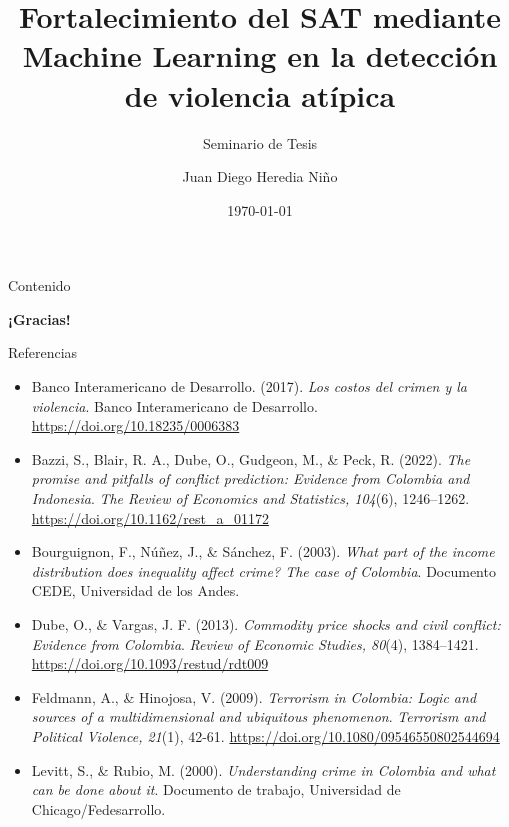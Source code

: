 \documentclass[aspectratio=169,xcolor=dvipsnames, t]{beamer}
\title[Pronóstico de Violencia Extrema]{Fortalecimiento del SAT mediante Machine Learning en la detección de violencia atípica}
\subtitle{Seminario de Tesis}
\author[Heredia Niño]{Juan Diego Heredia Niño}
\institute[Universidad de los Andes]{Facultad de Economía \newline Universidad de los Andes}
\date{\today}
\begin{document}
\maketitlepage

\begin{frame}[t]{Contenido}
    \tableofcontents
\end{frame}









\begin{frame}{}
    \vspace{3.5cm}
    \centering
    \LARGE \alert{\textbf{¡Gracias!}} 

\end{frame}

\begin{frame}{Referencias}

\begin{itemize}
\tiny
    \item Banco Interamericano de Desarrollo. (2017). \textit{Los costos del crimen y la violencia}. Banco Interamericano de Desarrollo. \url{https://doi.org/10.18235/0006383}

    \item Bazzi, S., Blair, R. A., Dube, O., Gudgeon, M., \& Peck, R. (2022). \textit{The promise and pitfalls of conflict prediction: Evidence from Colombia and Indonesia}. \textit{The Review of Economics and Statistics, 104}(6), 1246–1262. \url{https://doi.org/10.1162/rest_a_01172}
    
    \item Bourguignon, F., Núñez, J., \& Sánchez, F. (2003). \textit{What part of the income distribution does inequality affect crime? The case of Colombia}. Documento CEDE, Universidad de los Andes.

    \item Dube, O., \& Vargas, J. F. (2013). \textit{Commodity price shocks and civil conflict: Evidence from Colombia}. \textit{Review of Economic Studies, 80}(4), 1384–1421. \url{https://doi.org/10.1093/restud/rdt009}

    \item Feldmann, A., \& Hinojosa, V. (2009). \textit{Terrorism in Colombia: Logic and sources of a multidimensional and ubiquitous phenomenon}. \textit{Terrorism and Political Violence, 21}(1), 42-61. \url{https://doi.org/10.1080/09546550802544694}

    \item Levitt, S., \& Rubio, M. (2000). \textit{Understanding crime in Colombia and what can be done about it}. Documento de trabajo, Universidad de Chicago/Fedesarrollo.


\end{itemize}
\end{frame}
\end{document}

